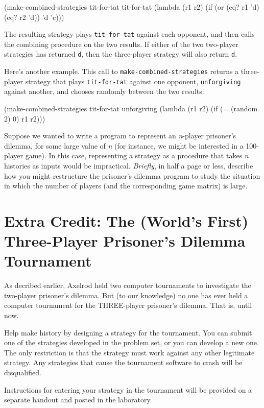 \beginlisp
(make-combined-strategies
  tit-for-tat tit-for-tat
  (lambda (r1 r2) (if (or (eq? r1 'd) (eq? r2 'd)) 'd 'c)))
\endlisp

The resulting strategy plays {\tt tit-for-tat} against each
opponent, and then calls the combining procedure on the two results.
If either of the two two-player strategies has returned {\tt d}, then
the three-player strategy will also return {\tt d}.

Here's another example. This call to {\tt make-combined-strategies}
returns a three-player strategy that plays {\tt tit-for-tat} against
one opponent, {\tt unforgiving} against another, and chooses randomly
between the two results:

\beginlisp
(make-combined-strategies
  tit-for-tat unforgiving
  (lambda (r1 r2) (if (= (random 2) 0) r1 r2)))
\endlisp



\vskip 8pt



Suppose we wanted to write a program to represent an {\it n}-player
prisoner's dilemma, for some large value of {\it n} (for instance, we
might be interested in a 100-player game). In this case, representing
a strategy as a procedure that takes {\it n} histories as inputs would
be impractical. {\it Briefly}, in half a page or less, describe how
you might restructure the prisoner's dilemma program to study the
situation in which the number of players (and the corresponding
game matrix) is large.


\section{Extra Credit: The (World's First) Three-Player Prisoner's Dilemma Tournament}


As decribed earlier, Axelrod held two computer tournaments to
investigate the two-player prisoner's dilemma. But (to our knowledge)
no one has ever held a computer tournament for the THREE-player
prisoner's dilemma. That is, until now.

Help make history by designing a strategy for the tournament. You can
submit one of the strategies developed in the problem set, or you can
develop a new one. The only restriction is that the strategy must work
against any other legitimate strategy. Any strategies that cause the
tournament software to crash will be disqualified.

Instructions for entering your strategy in the tournament will be
provided on a separate handout and posted in the laboratory.

